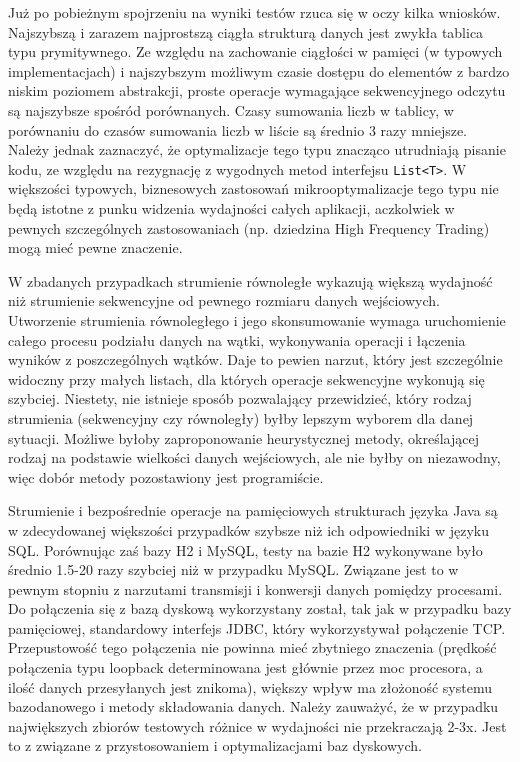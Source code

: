\documentclass[12pt]{extarticle}
\begin{document}
    Już po pobieżnym spojrzeniu na wyniki testów rzuca się w oczy kilka wniosków. Najszybszą i zarazem najprostszą ciągła strukturą danych jest zwykła tablica typu prymitywnego. Ze względu na zachowanie ciągłości w pamięci (w typowych implementacjach) i najszybszym możliwym czasie dostępu do elementów z bardzo niskim poziomem abstrakcji, proste operacje wymagające sekwencyjnego odczytu są najszybsze spośród porównanych. Czasy sumowania liczb w tablicy, w porównaniu do czasów sumowania liczb w liście są średnio 3 razy mniejsze. Należy jednak zaznaczyć, że optymalizacje tego typu znacząco utrudniają pisanie kodu, ze względu na rezygnację z wygodnych metod interfejsu \texttt{List<T>}. W większości typowych, biznesowych zastosowań mikrooptymalizacje tego typu nie będą istotne z punku widzenia wydajności całych aplikacji, aczkolwiek w pewnych szczególnych zastosowaniach (np. dziedzina High Frequency Trading) mogą mieć pewne znaczenie.

    W zbadanych przypadkach strumienie równoległe wykazują większą wydajność niż strumienie sekwencyjne od pewnego rozmiaru danych wejściowych. Utworzenie strumienia równoległego i jego skonsumowanie wymaga uruchomienie całego procesu podziału danych na wątki, wykonywania operacji i łączenia wyników z poszczególnych wątków. Daje to pewien narzut, który jest szczególnie widoczny przy małych listach, dla których operacje sekwencyjne wykonują się szybciej. Niestety, nie istnieje sposób pozwalający przewidzieć, który rodzaj strumienia (sekwencyjny czy równoległy) byłby lepszym wyborem dla danej sytuacji. Możliwe byłoby zaproponowanie heurystycznej metody, określającej rodzaj na podstawie wielkości danych wejściowych, ale nie byłby on niezawodny, więc dobór metody pozostawiony jest programiście.

    Strumienie i bezpośrednie operacje na pamięciowych strukturach języka Java są w zdecydowanej większości przypadków szybsze niż ich odpowiedniki w języku SQL. Porównując zaś bazy H2 i MySQL, testy na bazie H2 wykonywane było średnio 1.5-20 razy szybciej niż w przypadku MySQL. Związane jest to w pewnym stopniu z narzutami transmisji i konwersji danych pomiędzy procesami. Do połączenia się z bazą dyskową wykorzystany został, tak jak w przypadku bazy pamięciowej, standardowy interfejs JDBC, który wykorzystywał połączenie TCP. Przepustowość tego połączenia nie powinna mieć zbytniego znaczenia (prędkość połączenia typu loopback determinowana jest głównie przez moc procesora, a ilość danych przesyłanych jest znikoma), większy wpływ ma złożoność systemu bazodanowego i metody składowania danych. Należy zauważyć, że w przypadku największych zbiorów testowych różnice w wydajności nie przekraczają 2-3x. Jest to z związane z przystosowaniem i optymalizacjami baz dyskowych.
\end{document}
